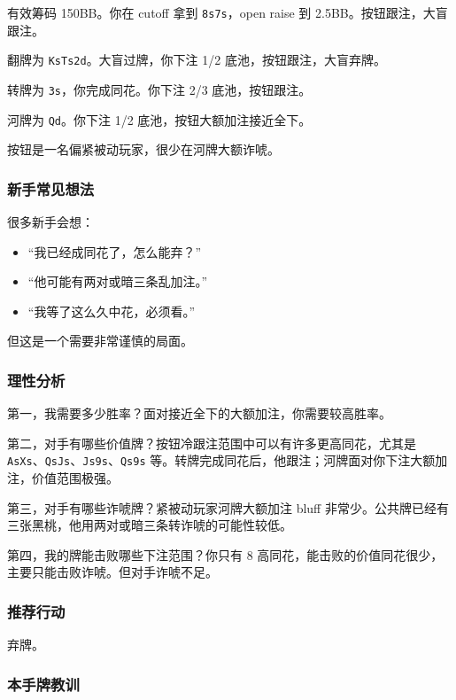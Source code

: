 有效筹码 150BB。你在 cutoff 拿到 \texttt{8s7s}，open raise 到 2.5BB。按钮跟注，大盲跟注。

翻牌为 \texttt{KsTs2d}。大盲过牌，你下注 1/2 底池，按钮跟注，大盲弃牌。

转牌为 \texttt{3s}，你完成同花。你下注 2/3 底池，按钮跟注。

河牌为 \texttt{Qd}。你下注 1/2 底池，按钮大额加注接近全下。

按钮是一名偏紧被动玩家，很少在河牌大额诈唬。

\subsubsection*{新手常见想法}

很多新手会想：

\begin{itemize}
\item “我已经成同花了，怎么能弃？”
\item “他可能有两对或暗三条乱加注。”
\item “我等了这么久中花，必须看。”
\end{itemize}

但这是一个需要非常谨慎的局面。

\subsubsection*{理性分析}

第一，我需要多少胜率？面对接近全下的大额加注，你需要较高胜率。

第二，对手有哪些价值牌？按钮冷跟注范围中可以有许多更高同花，尤其是 \texttt{AsXs}、\texttt{QsJs}、\texttt{Js9s}、\texttt{Qs9s} 等。转牌完成同花后，他跟注；河牌面对你下注大额加注，价值范围极强。

第三，对手有哪些诈唬牌？紧被动玩家河牌大额加注 bluff 非常少。公共牌已经有三张黑桃，他用两对或暗三条转诈唬的可能性较低。

第四，我的牌能击败哪些下注范围？你只有 8 高同花，能击败的价值同花很少，主要只能击败诈唬。但对手诈唬不足。

\subsubsection*{推荐行动}

弃牌。

\subsubsection*{本手牌教训}


